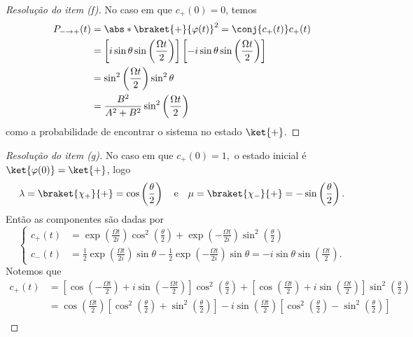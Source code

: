 \begin{proof}[Resolução do item (f)]
    No caso em que \(c_+(0) = 0\), temos
    \begin{align*}
        P_{-\to+}(t) &= \abs*{\braket{+}{\varphi(t)}}^2 = \conj{c_+(t)}c_+(t)\\
               &= \left[i\sin\theta\sin\left(\frac{\Omega t}{2}\right)\right]\left[-i\sin\theta\sin\left(\frac{\Omega t}{2}\right)\right]\\
               &= \sin^2\left(\frac{\Omega t}{2}\right) \sin^2\theta\\
               &= \frac{B^2}{A^2 + B^2}\sin^2\left(\frac{\Omega t}{2}\right)
    \end{align*}
    como a probabilidade de encontrar o sistema no estado \(\ket{+}\).
\end{proof}
\begin{proof}[Resolução do item (g)]
    No caso em que \(c_+(0) = 1,\) o estado inicial é \(\ket{\varphi(0)} = \ket{+}\), logo
    \begin{equation*}
        \lambda = \braket{\chi_+}{+} = \cos\left(\frac\theta2\right)
        \quad\text{e}\quad
        \mu = \braket{\chi_-}{+} = -\sin\left(\frac\theta2\right).
    \end{equation*}
    Então as componentes são dadas por
    \begin{equation*}
        \left\{
        \begin{aligned}
            c_+(t) &= \exp\left(\frac{\Omega t}{2i}\right)\cos^2\left(\frac\theta2\right) + \exp\left(-\frac{\Omega t}{2i}\right)\sin^2\left(\frac\theta2\right)\\
            c_-(t) &= \frac12\exp\left(\frac{\Omega t}{2i}\right)\sin\theta - \frac12\exp\left(-\frac{\Omega t}{2i}\right)\sin\theta = -i \sin\theta \sin\left(\frac{\Omega t}{2}\right).
        \end{aligned}\right.
    \end{equation*}
    Notemos que
    \begin{align*}
        c_+(t) &= \left[\cos\left(-\frac{\Omega t}{2}\right) + i\sin\left(-\frac{\Omega t}{2}\right)\right]\cos^2\left(\frac{\theta}{2}\right) +  \left[\cos\left(\frac{\Omega t}{2}\right) + i\sin\left(\frac{\Omega t}{2}\right)\right]\sin^2\left(\frac{\theta}{2}\right)\\
               &= \cos\left(\frac{\Omega t}{2}\right) \left[\cos^2\left(\frac{\theta}{2}\right) + \sin^2\left(\frac{\theta}{2}\right)\right] - i\sin \left(\frac{\Omega t}{2}\right) \left[\cos^2\left(\frac{\theta}{2}\right) - \sin^2\left(\frac{\theta}{2}\right)\right]\\

\end{align*}
\end{proof}
